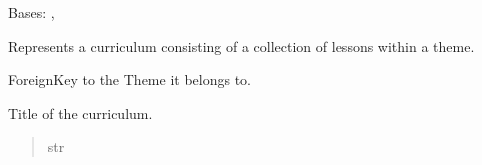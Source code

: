 \documentclass[letterpaper,10pt,english]{sphinxmanual}
\begin{document}
\begin{fulllineitems}
\label{\detokenize{courses:courses.models.Curriculum}}
\pysigstartsignatures
\pysiglinewithargsret
{}
{\sphinxparamcomma {}}
{}
\pysigstopsignatures
\sphinxAtStartPar
Bases: {\hyperref[\detokenize{core:core.models.AuditableMixin}]{}}, 

\sphinxAtStartPar
Represents a curriculum consisting of a collection of lessons within a theme.

\begin{fulllineitems}
\label{\detokenize{courses:courses.models.Curriculum.theme}}
\pysigstartsignatures
\pysigline
{}
\pysigstopsignatures
\sphinxAtStartPar
ForeignKey to the Theme it belongs to.
\begin{quote}\begin{description}
\sphinxAtStartPar
{\hyperref[\detokenize{courses:courses.models.Theme}]{}}

\end{description}\end{quote}

\end{fulllineitems}


\begin{fulllineitems}
\label{\detokenize{courses:courses.models.Curriculum.title}}
\pysigstartsignatures
\pysigline
{}
\pysigstopsignatures
\sphinxAtStartPar
Title of the curriculum.
\begin{quote}\begin{description}
\sphinxAtStartPar
str

\end{description}\end{quote}

\end{fulllineitems}


\end{fulllineitems}
\end{document}
